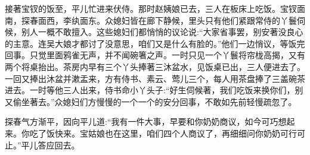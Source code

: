 \begin{parag}
    接著宝钗的饭至，平儿忙进来伏侍。那时赵姨娘已去，三人在板床上吃饭。宝钗面南，探春面西，李纨面东。众媳妇皆在廊下静候，里头只有他们紧跟常侍的丫鬟伺候，别人一概不敢擅入。这些媳妇们都悄悄的议论说:“大家省事罢，别安著没良心的主意。连吴大娘才都讨了没意思，咱们又是什么有脸的。”他们一边悄议，等饭完回事。只觉里面鸦雀无声，并不闻碗箸之声。一时只见一个丫鬟将帘栊高揭，又有两个将桌抬出。茶房内早有三个丫头捧著三沐盆水，见饭桌已出，三人便进去了。一回又捧出沐盆并漱盂来，方有侍书、素云、莺儿三个，每人用茶盘捧了三盖碗茶进去。一时等他三人出来，侍书命小丫头子:“好生伺候著，我们吃饭来换你们，别又偷坐著去。”众媳妇们方慢慢的一个一个的安分回事，不敢如先前轻慢疏忽了。
\end{parag}


\begin{parag}
    探春气方渐平，因向平儿道:“我有一件大事，早要和你奶奶商议，如今可巧想起来。你吃了饭快来。宝姑娘也在这里，咱们四个人商议了，再细细问你奶奶可行可止。”平儿答应回去。
\end{parag}


